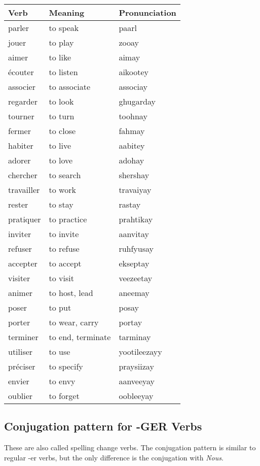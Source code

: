 \begin{longtable}{| l | l | l |}
\hline
Verb 		& Meaning 		& Pronunciation	\\
\hline
\endhead
parler		& to speak		& paarl			\\ 	\hline
jouer		& to play		& zooay			\\	\hline
aimer		& to like		& aimay			\\	\hline
\'ecouter	& to listen		& aikootey		\\	\hline
associer	& to associate	& associay		\\	\hline
regarder	& to look		& ghugarday		\\	\hline
tourner		& to turn		& toohnay		\\	\hline
fermer		& to close		& fahmay		\\	\hline
habiter		& to live		& aabitey		\\	\hline
adorer 		& to love		& adohay		\\	\hline
chercher	& to search		& shershay		\\	\hline
travailler	& to work		& travaiyay		\\	\hline
rester      & to stay       & rastay        \\  \hline
pratiquer   & to practice   & prahtikay     \\  \hline
inviter     & to invite     & aanvitay      \\  \hline
refuser     & to refuse     & ruhfyusay     \\  \hline
accepter    & to accept     & ekseptay      \\  \hline
visiter     & to visit      & veezeetay     \\  \hline
animer      & to host, lead & aneemay       \\  \hline
poser       & to put        & posay         \\  \hline
porter      & to wear, carry& portay        \\  \hline
terminer    & to end, terminate & tarminay  \\  \hline
utiliser    & to use        & yootileezayy  \\  \hline
pr\'eciser  & to specify    & praysiizay    \\  \hline
envier      & to envy       & aanveeyay     \\  \hline
oublier     & to forget     & oobleeyay     \\  \hline
\end{longtable}

\subsection{Conjugation pattern for -GER Verbs}
These are also called spelling change verbs. The conjugation pattern is
similar to regular -er verbs, but the only difference is the conjugation
with \emph{Nous}.

